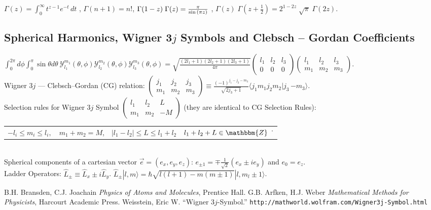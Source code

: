 \documentclass[10.5pt,letterpaper]{article}
\begin{document}
\noindent $\Gamma(z) = \int_0^\infty  t^{z-1} e^{-t}\,dt $ \space , \space $\Gamma(n+1)=n!$\space , \space $ \Gamma(1-z) \; \Gamma(z) = {\pi \over \sin{(\pi z)}} \,\! $ \space , \space  $\Gamma(z) \; \Gamma\left(z + \frac{1}{2}\right) = 2^{1-2z} \; \sqrt{\pi} \; \Gamma(2z). \,\! $


\subsection*{Spherical Harmonics, Wigner 3$j$ Symbols and Clebsch -- Gordan Coefficients}
$\int_0^{2 \pi} d\phi \int_0^{\pi} \sin \theta d\theta \ \mathcal{Y}_{l_1}^{m_1}(\theta,\phi) \mathcal{Y}_{l_2}^{m_2}(\theta,\phi) \mathcal{Y}_{l_3}^{m_3}(\theta,\phi)=\sqrt{\frac{(2l_1+1)(2l_2+1)(2l_3+1)}{4 \pi}} \begin{pmatrix}
  l_1 & l_2 & l_3\\
  0 & 0 & 0
\end{pmatrix}
\begin{pmatrix}
  l_1 & l_2 & l_3\\
  m_1 & m_2 & m_3
\end{pmatrix}
$.
\\

\noindent Wigner 3$j$ --- Clebsch--Gordan (CG) relation:
$
\begin{pmatrix}
  j_1 & j_2 & j_3\\
  m_1 & m_2 & m_3
\end{pmatrix}
\equiv \frac{(-1)^{j_1-j_2-m_3}}{\sqrt{2j_3+1}} \langle j_1 m_1 j_2 m_2 | j_3 \, {-m_3} \rangle.$\\

\noindent Selection rules for Wigner 3$j$ Symbol $\begin{pmatrix}  l_1 & l_2 & L\\   m_1 & m_2 & -M \end{pmatrix}$ (they are identical to CG Selection Rules):

\noindent 
\begin{tabular}{llll}
$-l_i \leq m_i \leq l_i, $ & $m_1+m_2=M$, & $|l_1-l_2|\leqslant L \leqslant l_1+l_2$ & $l_1+l_2+L \in \mathbbm{Z}$  \.\ 
\end{tabular}
\\

\noindent Spherical components of a cartesian vector $\vec e=(e_x,e_y,e_z)$: $e_{\pm 1}=\mp \frac{1}{\sqrt{2}} \left( e_x\pm i e_y \right)$ and $e_0=e_z$.\\

\noindent Ladder Operators: $ \hat L_{\pm}\equiv \hat L_x\pm i \hat L_y$. \space \space \space $\hat L_{\pm} |l,m \rangle=\hbar \sqrt{l(l+1)-m(m\pm1)}|l,m_l\pm1 \rangle$.
\begin{thebibliography}{}
\bibitem{} B.H. Bransden, C.J. Joachain \textit{Physics of Atoms and Molecules}, Prentice Hall.
\bibitem{} G.B. Arfken, H.J. Weber \textit{Mathematical Methods for Physicists}, Harcourt Academic Press.
\bibitem{} Weisstein, Eric W. ``Wigner 3$j$-Symbol.'' \verb|http://mathworld.wolfram.com/Wigner3j-Symbol.html|
\end{thebibliography}
\end{document}

